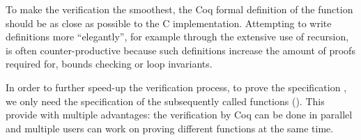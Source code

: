 To make the verification the smoothest, the Coq formal definition of the function
should be as close as possible to the C implementation.
Attempting to write definitions more ``elegantly'', for example through the extensive
use of recursion, is often counter-productive because such definitions increase the
amount of proofs required for, \eg bounds checking or loop invariants.

In order to further speed-up the verification process, to prove the specification
, we only need the specification of the subsequently
called functions (\eg {}).
This provide with multiple advantages: the verification by Coq can be
done in parallel and multiple users can work on proving different functions at
the same time.


%
%
%
%


